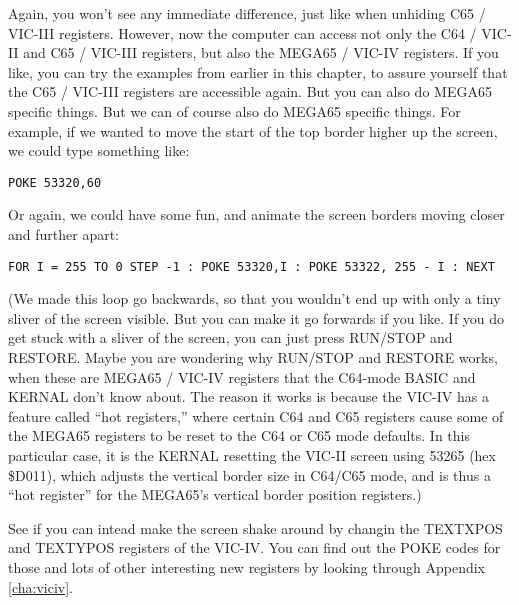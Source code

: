 Again, you won't see any immediate difference, just like when unhiding C65 / VIC-III registers.  However, now the computer
can access not only the C64 / VIC-II and C65 / VIC-III registers, but also the MEGA65 / VIC-IV registers.  If you like,
you can try the examples from earlier in this chapter, to assure yourself that the C65 / VIC-III registers are accessible again.
But you can also do MEGA65 specific things.  But we can of course also do MEGA65 specific things. For example, if we wanted to move
the start of the top border higher up the screen, we could type something like:

\begin{tcolorbox}[colback=black,coltext=white]
\verbatimfont{\codefont}
\begin{verbatim}
POKE 53320,60
\end{verbatim}
\end{tcolorbox}

Or again, we could have some fun, and animate the screen borders moving closer and further apart:

\begin{tcolorbox}[colback=black,coltext=white]
\verbatimfont{\codefont}
\begin{verbatim}
FOR I = 255 TO 0 STEP -1 : POKE 53320,I : POKE 53322, 255 - I : NEXT
\end{verbatim}
\end{tcolorbox}

(We made this loop go backwards, so that you wouldn't end up with only a tiny sliver of the
screen visible.  But you can make it go forwards if you like. If you do get stuck with a sliver
of the screen, you can just press RUN/STOP and RESTORE.  Maybe you are wondering why RUN/STOP
and RESTORE works, when these are MEGA65 / VIC-IV registers that the C64-mode BASIC and KERNAL
don't know about.  The reason it works is because the VIC-IV has a feature called ``hot registers,''
where certain C64 and C65 registers cause some of the MEGA65 registers to be reset to the C64 or
C65 mode defaults. In this particular case, it is the KERNAL resetting the VIC-II screen using
53265 (hex \$D011), which adjusts the vertical border size in C64/C65 mode, and is thus a ``hot register''
for the MEGA65's vertical border position registers.)

See if you can intead make the screen shake around by changin the TEXTXPOS and TEXTYPOS registers of
the VIC-IV.  You can find out the POKE codes for those and lots of other interesting new registers
by looking through Appendix \ref{cha:viciv}.

